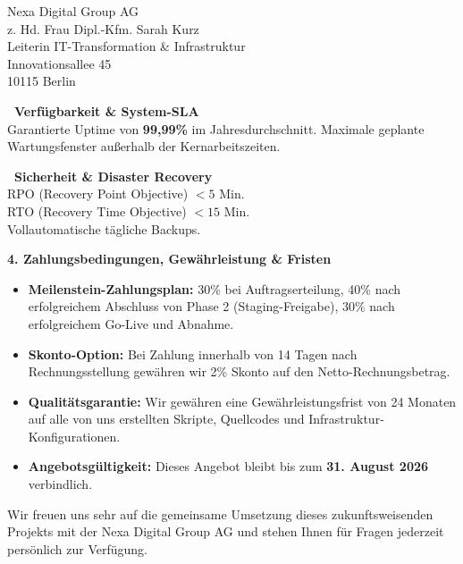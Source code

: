 \documentclass[11pt,a4paper]{dinbrief}
\begin{document}
\begin{letter}{%
  Nexa Digital Group AG\\
  z. Hd. Frau Dipl.-Kfm. Sarah Kurz\\
  Leiterin IT-Transformation \& Infrastruktur\\
  Innovationsallee 45\\
  10115 Berlin
}
\vspace{0.2cm}
\noindent
\begin{minipage}[t]{0.48\textwidth}
  \begin{tcolorbox}[colback=lightbg,colframe=navyprimary!40,arc=3pt,boxrule=0.8pt,top=4pt,bottom=4pt]
    \small
    \textcolor{navyprimary}{\textbf{\faServer~Verfügbarkeit \& System-SLA}}\\
    Garantierte Uptime von \textbf{99,99\%} im Jahresdurchschnitt. Maximale geplante Wartungsfenster außerhalb der Kernarbeitszeiten.
  \end{tcolorbox}
\end{minipage}\hfill
\begin{minipage}[t]{0.48\textwidth}
  \begin{tcolorbox}[colback=lightbg,colframe=navyprimary!40,arc=3pt,boxrule=0.8pt,top=4pt,bottom=4pt]
    \small
    \textcolor{navyprimary}{\textbf{\faLock~Sicherheit \& Disaster Recovery}}\\
    RPO (Recovery Point Objective) $< 5$ Min.\\
    RTO (Recovery Time Objective) $< 15$ Min.\\
    Vollautomatische tägliche Backups.
  \end{tcolorbox}
\end{minipage}

\vspace{0.3cm}
\textcolor{navyprimary}{\large\textbf{4. Zahlungsbedingungen, Gewährleistung \& Fristen}}

\begin{itemize}[leftmargin=1.5em,itemsep=2pt,parsep=0pt,label=\textcolor{accentteal}{\small\faCheck}]
  \item \textbf{Meilenstein-Zahlungsplan:} 30\% bei Auftragserteilung, 40\% nach erfolgreichem Abschluss von Phase 2 (Staging-Freigabe), 30\% nach erfolgreichem Go-Live und Abnahme.
  \item \textbf{Skonto-Option:} Bei Zahlung innerhalb von 14 Tagen nach Rechnungsstellung gewähren wir 2\% Skonto auf den Netto-Rechnungsbetrag.
  \item \textbf{Qualitätsgarantie:} Wir gewähren eine Gewährleistungsfrist von 24 Monaten auf alle von uns erstellten Skripte, Quellcodes und Infrastruktur-Konfigurationen.
  \item \textbf{Angebotsgültigkeit:} Dieses Angebot bleibt bis zum \textbf{31. August 2026} verbindlich.
\end{itemize}

\vspace{0.3cm}
Wir freuen uns sehr auf die gemeinsame Umsetzung dieses zukunftsweisenden Projekts mit der Nexa Digital Group AG und stehen Ihnen für Fragen jederzeit persönlich zur Verfügung.


\end{letter}
\end{document}
